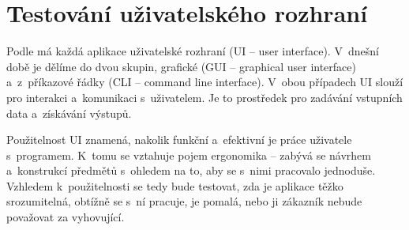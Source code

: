 		\section{Testování uživatelského rozhraní}
		Podle \citep{Patton} má každá aplikace uživatelské rozhraní (UI -- user interface). V~dnešní době je dělíme do dvou skupin, grafické (GUI -- graphical user interface) a~z~příkazové řádky (CLI -- command line interface). V~obou případech UI slouží pro interakci a~komunikaci s~uživatelem. Je to prostředek pro zadávání vstupních data a~získávání výstupů.
		
		Použitelnost UI znamená, nakolik funkční a~efektivní je práce uživatele s~programem. K~tomu se vztahuje pojem ergonomika -- zabývá se návrhem a~konstrukcí předmětů s~ohledem na to, aby se s~nimi pracovalo jednoduše. Vzhledem k~použitelnosti se tedy bude testovat, zda je aplikace těžko srozumitelná, obtížně se s~ní pracuje, je pomalá, nebo ji zákazník nebude považovat za vyhovující.
		
